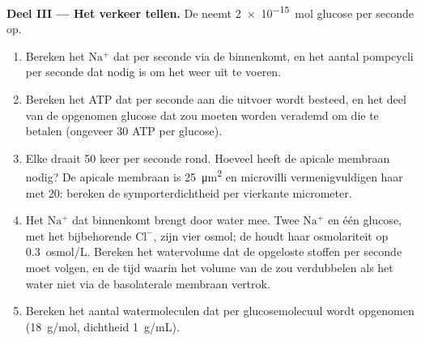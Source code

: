 \begin{problem}
\medskip
\noindent\textbf{Deel III --- Het verkeer tellen.}
De  neemt \qty{2e-15}{mol} glucose per seconde op.
\begin{enumerate}[resume]
  \item Bereken het $\mathrm{Na^+}$ dat per seconde via de 
        binnenkomt, en het aantal pompcycli per seconde dat nodig is om het
        weer uit te voeren.
  \item Bereken het ATP dat per seconde aan die uitvoer wordt besteed, en
        het deel van de opgenomen glucose dat zou moeten worden verademd om
        die te betalen (ongeveer 30 ATP per glucose).
  \item Elke  draait \qty{50}{} keer per seconde rond. Hoeveel
         heeft de apicale membraan nodig? De apicale membraan is
        \qty{25}{\micro m^2} en microvilli vermenigvuldigen haar met
        \qty{20}{}: bereken de symporterdichtheid per vierkante micrometer.
  \item Het $\mathrm{Na^+}$ dat binnenkomt brengt door  water mee.
        Twee $\mathrm{Na^+}$ en één glucose, met het bijbehorende
        $\mathrm{Cl^-}$, zijn vier osmol; de  houdt haar osmolariteit op
        \qty{0.3}{osmol/L}. Bereken het watervolume dat de opgeloste
        stoffen per seconde moet volgen, en de tijd waarin het volume van de
         zou verdubbelen als het water niet via de basolaterale membraan
        vertrok.
  \item Bereken het aantal watermoleculen dat per glucosemolecuul wordt
        opgenomen (\qty{18}{g/mol}, dichtheid \qty{1}{g/mL}).
\end{enumerate}


\end{problem}
